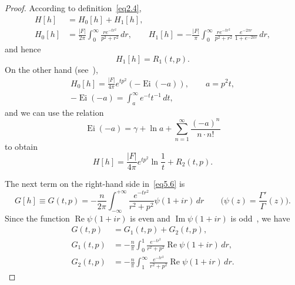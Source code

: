 \documentclass{amsart}
\theoremstyle{plain}
\theoremstyle{definition}
\numberwithin{equation}{section}
\begin{document}
\begin{proof}
According to definition~\eqref{eq2.4},
\begin{align*}
H[h]&=H_0[h]+H_1[h],
\\
H_0[h]&=\frac{|F|}{2\pi}\int_0^\infty\frac{re^{-tr^2}}{p^2+r^2}\,dr,\qquad
H_1[h]=-\frac{|F|}{\pi}\int_0^\infty\frac{re^{-tr^2}}{p^2+r^2}\,
\frac{e^{-2\pi r}}{1+e^{-2\pi r}}\,dr,
\end{align*}
and hence
$$
H_1[h]=R_1(t,p).
$$
On the other hand (see~\cite{19}),
\begin{gather*}
H_0[h]=\frac{|F|}{4\pi}e^{tp^2}(-\operatorname{Ei}(-a)),\qquad
a=p^2t,
\\
-\operatorname{Ei}(-a)=\int_a^\infty e^{-t}t^{-1}\,dt,
\end{gather*}
and we can use the relation
$$
\operatorname{Ei}(-a)=\gamma+\ln a+ \sum_{n=1}^\infty
\frac{(-a)^n}{n\cdot n!}
$$
to obtain
\begin{equation}
\label{eq6.10}
H[h]=\frac{|F|}{4\pi}e^{tp^2}\ln\frac{1}{t}+R_2(t,p).
\end{equation}

The next term on the right-hand side in~\eqref{eq5.6} is
\begin{equation}
\label{eq6.11}
G[h]\equiv G(t,p)=-\frac{n}{2\pi}\int_{-\infty}^{+\infty}
\frac{e^{-tr^2}}{r^2+p^2}\psi(1+ir)\,dr\qquad
\biggl(\psi(z)=\frac{\Gamma'}{\Gamma}(z)\biggr).
\end{equation}
Since the function $\operatorname{Re}\psi(1+ir)$ is even and
$\operatorname{Im}\psi(1+ir)$ is odd~\cite{20}, we have
\begin{align}
\label{eq6.12}
G(t,p)&=G_1(t,p)+G_2(t,p),
\\
\label{eq6.13}
G_1(t,p)&=-\frac{n}{\pi}\int_{0}^{1}\frac{e^{-tr^2}}{r^2+p^2}
\operatorname{Re}\psi(1+ir)\,dr,
\\
\label{eq6.14}
G_2(t,p)&=-\frac{n}{\pi}\int_{1}^{\infty}\frac{e^{-tr^2}}{r^2+p^2}
\operatorname{Re}\psi(1+ir)\,dr.
\end{align}


\end{proof}
\end{document}
